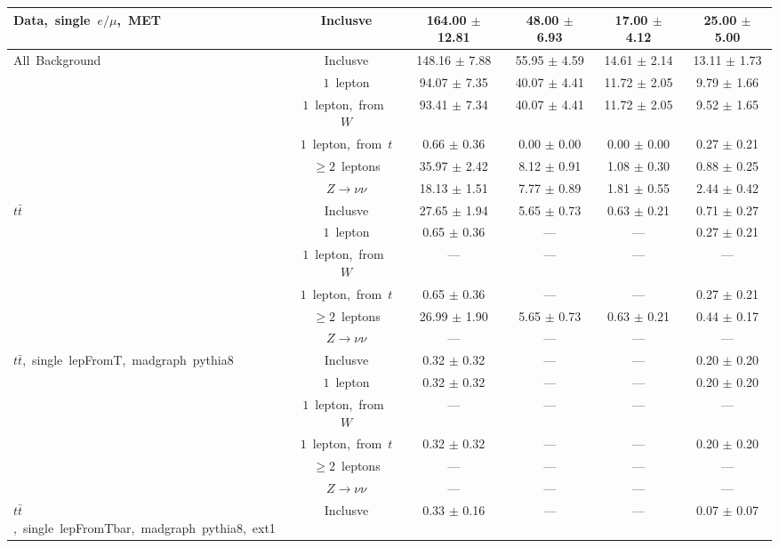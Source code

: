 \documentclass{article}
\begin{document}
\begin{longtable}{|l|c|c|c|c|c|}
\multirow{1}{*}{Data,~single~$e/\mu$,~MET} & Inclusve  & 164.00 $\pm$ 12.81  & 48.00 $\pm$ 6.93  & 17.00 $\pm$ 4.12  & 25.00 $\pm$ 5.00 \\* 
\hline \hline 
\multirow{6}{*}{All~Background} & Inclusve  & 148.16 $\pm$ 7.88  & 55.95 $\pm$ 4.59  & 14.61 $\pm$ 2.14  & 13.11 $\pm$ 1.73 \\* 
 & $1$~lepton  & 94.07 $\pm$ 7.35  & 40.07 $\pm$ 4.41  & 11.72 $\pm$ 2.05  & 9.79 $\pm$ 1.66 \\* 
 & $1$~lepton,~from~$W$  & 93.41 $\pm$ 7.34  & 40.07 $\pm$ 4.41  & 11.72 $\pm$ 2.05  & 9.52 $\pm$ 1.65 \\* 
 & $1$~lepton,~from~$t$  & 0.66 $\pm$ 0.36  & 0.00 $\pm$ 0.00  & 0.00 $\pm$ 0.00  & 0.27 $\pm$ 0.21 \\* 
 & $\ge2$~leptons  & 35.97 $\pm$ 2.42  & 8.12 $\pm$ 0.91  & 1.08 $\pm$ 0.30  & 0.88 $\pm$ 0.25 \\* 
 & $Z\rightarrow\nu\nu$  & 18.13 $\pm$ 1.51  & 7.77 $\pm$ 0.89  & 1.81 $\pm$ 0.55  & 2.44 $\pm$ 0.42 \\* 
\hline 
\multirow{6}{*}{$t\bar{t}$} & Inclusve  & 27.65 $\pm$ 1.94  & 5.65 $\pm$ 0.73  & 0.63 $\pm$ 0.21  & 0.71 $\pm$ 0.27 \\* 
 & $1$~lepton  & 0.65 $\pm$ 0.36  & ---  & ---  & 0.27 $\pm$ 0.21 \\* 
 & $1$~lepton,~from~$W$  & ---  & ---  & ---  & --- \\* 
 & $1$~lepton,~from~$t$  & 0.65 $\pm$ 0.36  & ---  & ---  & 0.27 $\pm$ 0.21 \\* 
 & $\ge2$~leptons  & 26.99 $\pm$ 1.90  & 5.65 $\pm$ 0.73  & 0.63 $\pm$ 0.21  & 0.44 $\pm$ 0.17 \\* 
 & $Z\rightarrow\nu\nu$  & ---  & ---  & ---  & --- \\* 
\hline 
\multirow{6}{*}{$t\bar{t}$,~single~lepFromT,~madgraph~pythia8} & Inclusve  & 0.32 $\pm$ 0.32  & ---  & ---  & 0.20 $\pm$ 0.20 \\* 
 & $1$~lepton  & 0.32 $\pm$ 0.32  & ---  & ---  & 0.20 $\pm$ 0.20 \\* 
 & $1$~lepton,~from~$W$  & ---  & ---  & ---  & --- \\* 
 & $1$~lepton,~from~$t$  & 0.32 $\pm$ 0.32  & ---  & ---  & 0.20 $\pm$ 0.20 \\* 
 & $\ge2$~leptons  & ---  & ---  & ---  & --- \\* 
 & $Z\rightarrow\nu\nu$  & ---  & ---  & ---  & --- \\* 
\hline 
\multirow{6}{*}{$t\bar{t}$,~single~lepFromTbar,~madgraph~pythia8,~ext1} & Inclusve  & 0.33 $\pm$ 0.16  & ---  & ---  & 0.07 $\pm$ 0.07 \\* 

\end{longtable}
\end{document}
